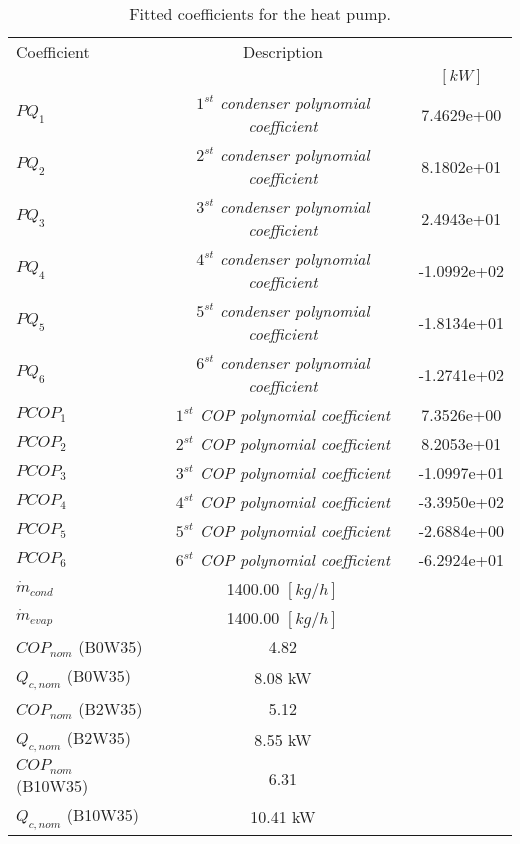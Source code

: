 \documentclass[english]{SPFShortReport}
\author{Dani Carbonell}
\begin{document}
\begin{table}[!ht]
\begin{small}
\caption{Fitted coefficients for the heat pump.}
\begin{center}
\resizebox{12cm}{!} 
{
\begin{tabular}{l | c c } 
\hline
\hline
Coefficient &Description & \\ 
 & &$[kW]$\\ 
\hline
$PQ_{1}$ & \emph{$1^{st}$ condenser polynomial coefficient}  & 7.4629e+00    \\ 
$PQ_{2}$ & \emph{$2^{st}$ condenser polynomial coefficient}  & 8.1802e+01    \\ 
$PQ_{3}$ & \emph{$3^{st}$ condenser polynomial coefficient}  & 2.4943e+01    \\ 
$PQ_{4}$ & \emph{$4^{st}$ condenser polynomial coefficient}  & -1.0992e+02    \\ 
$PQ_{5}$ & \emph{$5^{st}$ condenser polynomial coefficient}  & -1.8134e+01    \\ 
$PQ_{6}$ & \emph{$6^{st}$ condenser polynomial coefficient}  & -1.2741e+02    \\ 
\hline
$PCOP_{1}$ & \emph{$1^{st}$ COP polynomial coefficient}  & 7.3526e+00    \\ 
$PCOP_{2}$ & \emph{$2^{st}$ COP polynomial coefficient}  & 8.2053e+01    \\ 
$PCOP_{3}$ & \emph{$3^{st}$ COP polynomial coefficient}  & -1.0997e+01    \\ 
$PCOP_{4}$ & \emph{$4^{st}$ COP polynomial coefficient}  & -3.3950e+02    \\ 
$PCOP_{5}$ & \emph{$5^{st}$ COP polynomial coefficient}  & -2.6884e+00    \\ 
$PCOP_{6}$ & \emph{$6^{st}$ COP polynomial coefficient}  & -6.2924e+01    \\ 
\hline
$\dot m_{cond}$ & 1400.00 $[kg/h]$\\ 
$\dot m_{evap}$ & 1400.00 $[kg/h]$\\ 
\hline
$COP_{nom}$ (B0W35)& 4.82 \\ 
$Q_{c,nom}$ (B0W35)& 8.08 kW\\ 
$COP_{nom}$ (B2W35)& 5.12 \\ 
$Q_{c,nom}$ (B2W35)& 8.55 kW\\ 
$COP_{nom}$ (B10W35)& 6.31 \\ 
$Q_{c,nom}$ (B10W35)& 10.41 kW\\ 
\hline
\hline
\end{tabular}
}
\label{CoefTable}
\end{center}
\end{small}
\end{table}
\end{document}
